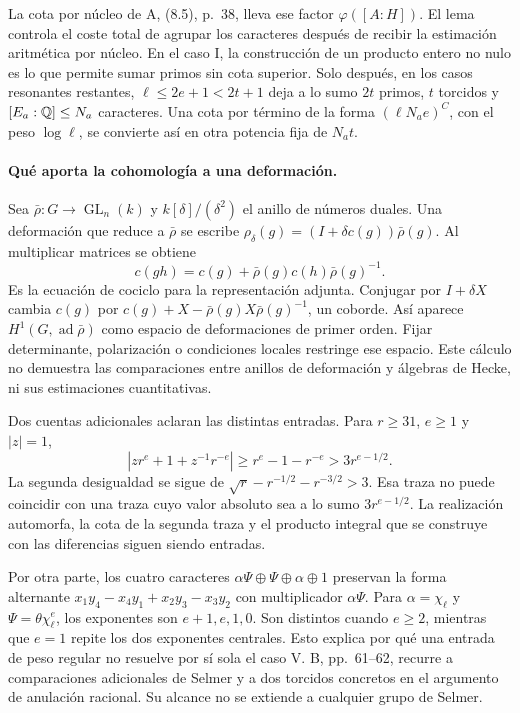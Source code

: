La cota por núcleo de A, (8.5), p.~38, lleva ese factor
$\varphi([A:H])$. El lema controla el coste total de
agrupar los caracteres después de recibir la estimación
aritmética por núcleo.
En el caso I, la construcción de un producto entero no
nulo es lo que permite sumar primos sin cota superior.
Solo después, en los casos resonantes restantes,
$\ell\le2e+1<2t+1$ deja a lo sumo $2t$ primos, $t$
torcidos y $[E_a:\mathbb{Q}]\le N_a$ caracteres.
Una cota por término de la forma $(\ell N_ae)^C$, con
el peso $\log\ell$, se convierte así en otra potencia
fija de $N_at$.

\paragraph{Qué aporta la cohomología a una deformación.}
Sea $\bar\rho:G\to\operatorname{GL}_n(k)$ y
$k[\delta]/(\delta^2)$ el anillo de números duales.
Una deformación que reduce a $\bar\rho$ se escribe
$\rho_\delta(g)=(I+\delta c(g))\bar\rho(g)$.
Al multiplicar matrices se obtiene
\[
 c(gh)=c(g)+\bar\rho(g)c(h)\bar\rho(g)^{-1}.
\]
Es la ecuación de cociclo para la representación adjunta.
Conjugar por $I+\delta X$ cambia $c(g)$ por
$c(g)+X-\bar\rho(g)X\bar\rho(g)^{-1}$, un coborde.
Así aparece $H^1(G,\operatorname{ad}\bar\rho)$ como
espacio de deformaciones de primer orden.
Fijar determinante, polarización o condiciones locales
restringe ese espacio.
Este cálculo no demuestra las comparaciones entre
anillos de deformación y álgebras de Hecke, ni sus
estimaciones cuantitativas.

Dos cuentas adicionales aclaran las distintas entradas.
Para $r\ge31$, $e\ge1$ y $|z|=1$,
\[
 |zr^e+1+z^{-1}r^{-e}|
 \ge r^e-1-r^{-e}>3r^{e-1/2}.
\]
La segunda desigualdad se sigue de
$\sqrt r-r^{-1/2}-r^{-3/2}>3$.
Esa traza no puede coincidir con una traza cuyo valor
absoluto sea a lo sumo $3r^{e-1/2}$.
La realización automorfa, la cota de la segunda traza y
el producto integral que se construye con las diferencias
siguen siendo entradas.

Por otra parte, los cuatro caracteres
$\alpha\Psi\oplus\Psi\oplus\alpha\oplus1$ preservan la
forma alternante
$x_1y_4-x_4y_1+x_2y_3-x_3y_2$ con multiplicador
$\alpha\Psi$.
Para $\alpha=\chi_\ell$ y $\Psi=\theta\chi_\ell^e$,
los exponentes son $e+1,e,1,0$.
Son distintos cuando $e\ge2$, mientras que $e=1$
repite los dos exponentes centrales.
Esto explica por qué una entrada de peso regular no
resuelve por sí sola el caso V.
B, pp.~61--62, recurre a comparaciones adicionales de
Selmer y a dos torcidos concretos en el argumento de
anulación racional. Su alcance no se extiende a cualquier
grupo de Selmer.

